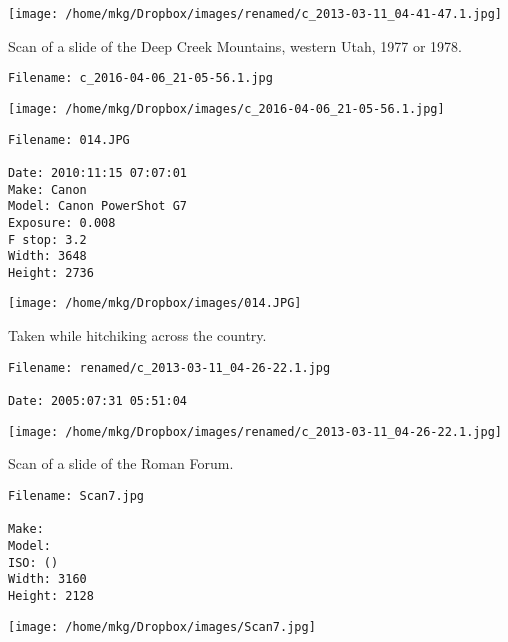 \begin{landscape}

\texttt{[image: /home/mkg/Dropbox/images/renamed/c\_2013-03-11\_04-41-47.1.jpg]}
\end{landscape}



\noindent Scan of a slide of the Deep Creek Mountains, western Utah, 1977 or 1978.
\begin{lstlisting}
Filename: c_2016-04-06_21-05-56.1.jpg

\end{lstlisting}

\clearpage

\texttt{[image: /home/mkg/Dropbox/images/c\_2016-04-06\_21-05-56.1.jpg]}
\clearpage


\noindent 
\begin{lstlisting}
Filename: 014.JPG

Date: 2010:11:15 07:07:01
Make: Canon
Model: Canon PowerShot G7
Exposure: 0.008
F stop: 3.2
Width: 3648
Height: 2736
\end{lstlisting}

\begin{landscape}

\texttt{[image: /home/mkg/Dropbox/images/014.JPG]}
\end{landscape}



\noindent Taken while hitchiking across the country.
\begin{lstlisting}
Filename: renamed/c_2013-03-11_04-26-22.1.jpg

Date: 2005:07:31 05:51:04
\end{lstlisting}

\clearpage

\texttt{[image: /home/mkg/Dropbox/images/renamed/c\_2013-03-11\_04-26-22.1.jpg]}
\clearpage


\noindent Scan of a slide of the Roman Forum.
\begin{lstlisting}
Filename: Scan7.jpg

Make: 
Model: 
ISO: ()
Width: 3160
Height: 2128
\end{lstlisting}

\begin{landscape}

\texttt{[image: /home/mkg/Dropbox/images/Scan7.jpg]}
\end{landscape}



